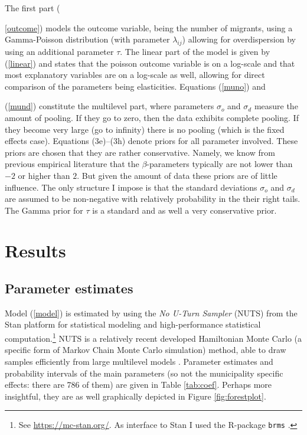 \documentclass[fleqn,10pt]{SelfArx} %
\begin{document}
        The first part ({\ref{outcome}) models the outcome variable, being the
          number of migrants, using a Gamma-Poisson distribution (with parameter
          $\lambda_{ij}$) allowing for overdispersion by using an additional
          parameter $\tau$. The linear part of the model is given by
          (\ref{linear}) and states that the poisson outcome variable is on a
          log-scale and that most explanatory variables are on a log-scale as
          well, allowing for direct comparison of the parameters being
          elasticities. Equations (\ref{muno}) and {(\ref{mund}) constitute the
            multilevel part, where parameters $\sigma_o$ and $\sigma_d$ measure
            the amount of pooling. If they go to zero, then the data exhibits
            complete pooling. If they become very large (go to infinity) there
            is no pooling (which is the fixed effects case). Equations
            (3e)--(3h) denote priors for all parameter involved.  These priors
            are chosen that they are rather conservative. Namely, we know from
            previous empirical literature that the $\beta$-parameters typically
            are not lower than $-2$ or higher than $2$. But given the amount of
            data these priors are of little influence. The only structure I
            impose is that the standard deviations $\sigma_o$ and $\sigma_d$ are
            assumed to be non-negative with relatively probability in the their
            right tails. The Gamma prior for $\tau$ is a standard and as well a
            very conservative prior.
                      
        \section{Results}

        \subsection{Parameter estimates}
        
        Model (\ref{model}) is estimated by using the \emph{No U-Turn Sampler}
        (NUTS) from the Stan platform for statistical modeling and
        high-performance statistical computation.\footnote{See
          \href{https://mc-stan.org/}{https://mc-stan.org/}. As interface to
          Stan \citep[see for an overview article of Stan][]{carpenter2017stan}
          I used the R-package \texttt{brms} \citep{brms}.} NUTS is a relatively
        recent developed Hamiltonian Monte Carlo (a specific form of Markov
        Chain Monte Carlo simulation) method, able to draw samples efficiently
        from large multilevel models \citep{hoffman2014no}. Parameter estimates
        and probability intervals of the main parameters (so not the
        municipality specific effects: there are 786 of them) are given in Table
        \ref{tab:coef}. Perhaps more insightful, they are as well graphically
        depicted in Figure \ref{fig:forestplot}.

}}
\end{document}
